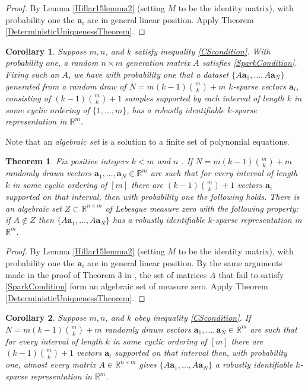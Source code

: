 \documentclass[journal, onecolumn]{IEEEtran}
\newtheorem{theorem}{Theorem}
\newtheorem{corollary}{Corollary}
\begin{document}
\begin{proof}
By Lemma \ref{Hillar15lemma2} (setting $M$ to be the identity matrix), with probability one the $\mathbf{a}_i$ are in general linear position. Apply Theorem \ref{DeterministicUniquenessTheorem}.
\end{proof} 

\begin{corollary}
Suppose $m, n$, and $k$ satisfy inequality \eqref{CScondition}. With probability one, a random $n \times m$ generation matrix $A$ satisfies \eqref{SparkCondition}. Fixing such an $A$, we have with probability one that a dataset $\{A\mathbf{a}_1, \ldots , A\mathbf{a}_N\}$ generated from a random draw of $N = m(k-1){m \choose k}+m$ $k$-sparse vectors $\mathbf{a}_i$, consisting of $(k-1){m \choose k}+1$ samples supported by each interval of length $k$ in some cyclic ordering of $\{1, \ldots, m\}$, has a robustly identifiable $k$-sparse representation in $\mathbb{R}^m$.
\end{corollary}

Note that an \emph{algebraic set} is a solution to a finite set of polynomial equations. 

\begin{theorem}\label{Theorem3}
Fix positive integers $k < m$ and $n$ . If $N = m(k-1){m \choose k}+m$ randomly drawn vectors $\mathbf{a}_1, \ldots, \mathbf{a}_N \in \mathbb{R}^m$ are such that for every interval of length $k$ in some cyclic ordering of $[m]$ there are $(k-1){m \choose k}+1$ vectors $\mathbf{a}_i$ supported on that interval, then with probability one the following holds. There is an algebraic set $Z \subset \mathbb{R}^{n \times m}$ of Lebesgue measure zero with the following property: if $A \notin Z$ then $\{A\mathbf{a}_1, \ldots , A\mathbf{a}_N \}$ has a robustly identifiable $k$-sparse representation in $\mathbb{R}^m$.
\end{theorem}

\begin{proof}
By Lemma \ref{Hillar15lemma2} (setting $M$ to be the identity matrix), with probability one the $\mathbf{a}_i$ are in general linear position. By the same arguments made in the proof of Theorem 3 in \cite{Hillar15}, the set of matrices $A$ that fail to satisfy \eqref{SparkCondition} form an algebraic set of measure zero. Apply Theorem \ref{DeterministicUniquenessTheorem}.
\end{proof}

\begin{corollary}
Suppose $m, n$, and $k$ obey inequality \eqref{CScondition}.  If $N = m(k-1){m \choose k}+m$ randomly drawn vectors $\mathbf{a}_1, \ldots, \mathbf{a}_N \in \mathbb{R}^m$ are such that for every interval of length $k$ in some cyclic ordering of $[m]$ there are $(k-1){m \choose k}+1$ vectors $\mathbf{a}_i$ supported on that interval then, with probability one, almost every matrix $A \in \mathbb{R}^{n \times m}$ gives $\{A\mathbf{a}_1, \ldots , A\mathbf{a}_N \}$ a robustly identifiable $k$-sparse representation in $\mathbb{R}^m$.
\end{corollary}
\end{document}
